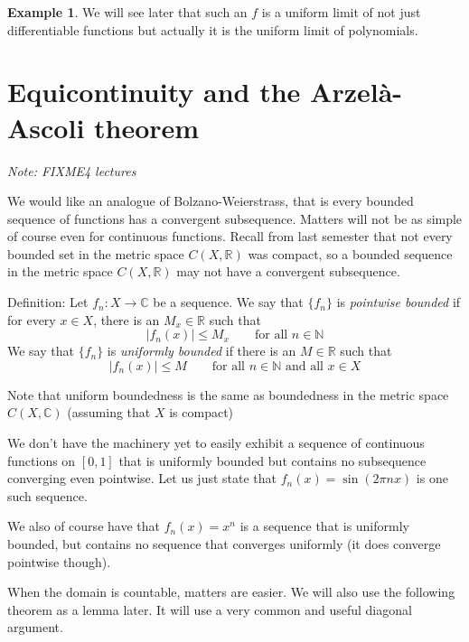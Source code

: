 \documentclass[12pt]{book}
\newcommand{\abs}[1]{\left\lvert {#1} \right\rvert}
\newcommand{\C}{{\mathbb{C}}}
\newcommand{\R}{{\mathbb{R}}}
\newcommand{\N}{{\mathbb{N}}}
\newcommand{\sectionnotes}[1]{\noindent \emph{Note: #1} \medskip \par}
\newcommand{\sectionnewpage}{\clearpage}
\theoremstyle{plain}
\theoremstyle{remark}
\theoremstyle{definition}
\theoremstyle{exercise}
\theoremstyle{example}
\newtheorem{example}[thm]{Example}
\begin{document}
\begin{example}
We will see later that such an $f$ is a uniform limit of not just
differentiable functions but actually it is the uniform limit of
polynomials.
\end{example}


\sectionnewpage
\section{Equicontinuity and the Arzel{\` a}-Ascoli theorem}
\label{sec:FIXME}

\sectionnotes{FIXME4 lectures}

\medskip

We would like an analogue of Bolzano-Weierstrass, that is every bounded
sequence of functions has a convergent subsequence.  Matters will not
be as simple of course even for continuous functions.  Recall from last
semester that not every bounded set in the metric space $C(X,\R)$ was compact,
so a bounded sequence in the metric space $C(X,\R)$ may not have a
convergent subsequence.

\medskip

Definition:
Let $f_n \colon X \to \C$ be a sequence.  We say that
$\{ f_n \}$
is \emph{pointwise bounded} if for every $x \in X$, there is an $M_x \in \R$
such that
$$
\abs{f_n(x)} \leq M_x \qquad \text{for all $n \in \N$}
$$
We say that
$\{ f_n \}$
is \emph{uniformly bounded} if there is an $M \in \R$
such that
$$
\abs{f_n(x)} \leq M \qquad \text{for all $n \in \N$ and all $x \in X$}
$$

\medskip

Note that uniform boundedness is the same as boundedness in the metric space
$C(X,\C)$ (assuming that $X$ is compact)

\medskip

We don't have the machinery yet to easily exhibit
a sequence of continuous functions
on $[0,1]$ that is uniformly bounded but contains no subsequence converging
even pointwise.  Let us just state that $f_n(x) = \sin (2\pi n x)$ is one
such sequence.

\medskip

We also of course have that $f_n(x)=x^n$ is a sequence that is uniformly
bounded, but contains no sequence that converges uniformly (it does converge
pointwise though).

\medskip

When the domain is countable, matters are easier.  We will also use the
following theorem as a lemma later.  It will use a very common and useful
diagonal argument.
\end{document}
